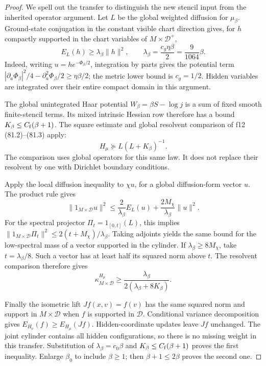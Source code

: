 \documentclass[11pt,oneside]{article}
\begin{document}
\begin{proof}
We spell out the transfer to distinguish
the new stencil input from the inherited
operator argument. Let \(L\) be the
global weighted diffusion for \(\mu_\beta\).
Ground-state conjugation in the constant
visible chart direction gives, for \(h\)
compactly supported in the chart variables
of \(M\times\mathcal D^+\),
\[
 E_L(h)\ge\lambda_\beta\|h\|^2,\qquad
 \lambda_\beta=\frac{c_g\eta\beta}{2}
                        =\frac9{1064}\beta.
\]
Indeed, writing \(u=h e^{-\Phi_\beta/2}\),
integration by parts gives the potential
term
\(|\partial_a\Phi_\beta|^2/4
 -\partial_a^2\Phi_\beta/2\ge\eta\beta/2\);
the metric lower bound is \(c_g=1/2\).
Hidden variables are integrated over
their entire compact domain in this
argument.

The global unintegrated Haar potential
\(W_\beta=\beta S-\log j\) is a sum of
fixed smooth finite-stencil terms.
Its mixed intrinsic Hessian row therefore
has a bound \(K_\beta\le C_{\rm f}(\beta+1)\).
The square estimate and global resolvent
comparison of f12 (81.2)--(81.3) apply:
\[
                         H_\mu\succeq L(L+K_\beta)^{-1}.
\]
The comparison uses global operators
for this same law. It does not replace
their resolvent by one with Dirichlet
boundary conditions.

Apply the local diffusion inequality to
\(\chi u\), for a global diffusion-form
vector \(u\). The product rule gives
\[
 \|1_{M\times\mathcal D}u\|^2
 \le \frac2{\lambda_\beta}E_L(u)
                   +\frac{2M_\chi}{\lambda_\beta}\|u\|^2.
\]
For the spectral projector
\(\Pi_t=1_{[0,t]}(L)\), this implies
\(\|1_{M\times\mathcal D}\Pi_t\|^2
\le2(t+M_\chi)/\lambda_\beta\).
Taking adjoints yields the same bound
for the low-spectral mass of a vector
supported in the cylinder. If
\(\lambda_\beta\ge8M_\chi\), take
\(t=\lambda_\beta/8\). Such a vector
has at least half its squared norm
above \(t\). The resolvent comparison
therefore gives
\[
 \kappa_{M\times\mathcal D}^{H_\mu}
       \ge\frac{\lambda_\beta}
                        {2(\lambda_\beta+8K_\beta)}.
\]

Finally the isometric lift \(Jf(x,v)=f(v)\)
has the same squared norm and support in
\(M\times\mathcal D\) when \(f\) is supported
in \(\mathcal D\). Conditional variance
decomposition gives
\(E_{H_\nu}(f)\ge E_{H_\mu}(Jf)\).
Hidden-coordinate updates leave \(Jf\)
unchanged. The joint cylinder contains
all hidden configurations, so there is
no missing weight in this transfer.
Substitution of \(\lambda_\beta=c_0\beta\)
and \(K_\beta\le C_{\rm f}(\beta+1)\)
proves the first inequality. Enlarge
\(\beta_0\) to include \(\beta\ge1\);
then \(\beta+1\le2\beta\) proves the
second one.
\end{proof}
\end{document}
